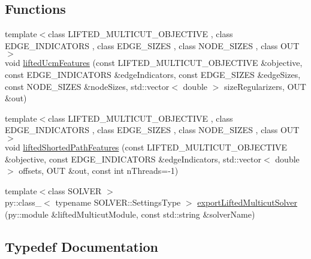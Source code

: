 \subsection*{Functions}
\begin{DoxyCompactItemize}
\item 
{\footnotesize template$<$class L\+I\+F\+T\+E\+D\+\_\+\+M\+U\+L\+T\+I\+C\+U\+T\+\_\+\+O\+B\+J\+E\+C\+T\+I\+V\+E , class E\+D\+G\+E\+\_\+\+I\+N\+D\+I\+C\+A\+T\+O\+R\+S , class E\+D\+G\+E\+\_\+\+S\+I\+Z\+E\+S , class N\+O\+D\+E\+\_\+\+S\+I\+Z\+E\+S , class O\+U\+T $>$ }\\void \hyperlink{namespacenifty_1_1graph_1_1optimization_1_1lifted__multicut_a1b3c26702144eea575aeec046471c4df}{lifted\+Ucm\+Features} (const L\+I\+F\+T\+E\+D\+\_\+\+M\+U\+L\+T\+I\+C\+U\+T\+\_\+\+O\+B\+J\+E\+C\+T\+I\+V\+E \&objective, const E\+D\+G\+E\+\_\+\+I\+N\+D\+I\+C\+A\+T\+O\+R\+S \&edge\+Indicators, const E\+D\+G\+E\+\_\+\+S\+I\+Z\+E\+S \&edge\+Sizes, const N\+O\+D\+E\+\_\+\+S\+I\+Z\+E\+S \&node\+Sizes, std\+::vector$<$ double $>$ size\+Regularizers, O\+U\+T \&out)
\item 
{\footnotesize template$<$class L\+I\+F\+T\+E\+D\+\_\+\+M\+U\+L\+T\+I\+C\+U\+T\+\_\+\+O\+B\+J\+E\+C\+T\+I\+V\+E , class E\+D\+G\+E\+\_\+\+I\+N\+D\+I\+C\+A\+T\+O\+R\+S , class E\+D\+G\+E\+\_\+\+S\+I\+Z\+E\+S , class N\+O\+D\+E\+\_\+\+S\+I\+Z\+E\+S , class O\+U\+T $>$ }\\void \hyperlink{namespacenifty_1_1graph_1_1optimization_1_1lifted__multicut_aa93e330f76d91d2c5ddeeb9d972d809d}{lifted\+Shorted\+Path\+Features} (const L\+I\+F\+T\+E\+D\+\_\+\+M\+U\+L\+T\+I\+C\+U\+T\+\_\+\+O\+B\+J\+E\+C\+T\+I\+V\+E \&objective, const E\+D\+G\+E\+\_\+\+I\+N\+D\+I\+C\+A\+T\+O\+R\+S \&edge\+Indicators, std\+::vector$<$ double $>$ offsets, O\+U\+T \&out, const int n\+Threads=-\/1)
\item 
{\footnotesize template$<$class S\+O\+L\+V\+E\+R $>$ }\\py\+::class\+\_\+$<$ typename S\+O\+L\+V\+E\+R\+::\+Settings\+Type $>$ \hyperlink{namespacenifty_1_1graph_1_1optimization_1_1lifted__multicut_a1295e6511368a32684e70efd7bcff118}{export\+Lifted\+Multicut\+Solver} (py\+::module \&lifted\+Multicut\+Module, const std\+::string \&solver\+Name)
\end{DoxyCompactItemize}


\subsection{Typedef Documentation}
\hypertarget{namespacenifty_1_1graph_1_1optimization_1_1lifted__multicut_a344995f0dd906c91911dcf3bc4b53397}{}
